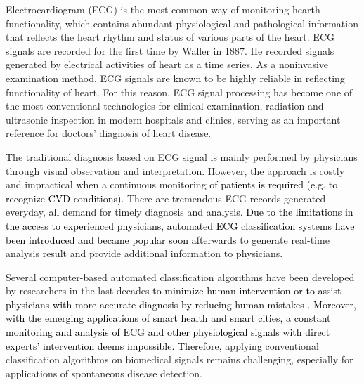 Electrocardiogram (ECG) is the most common way of monitoring hearth functionality, which %
contains abundant physiological and pathological information that reflects the heart rhythm and status of various parts of the heart. ECG signals are recorded for the first time by Waller in 1887\cite{besterman1979waller}. %
He recorded signals generated by electrical activities of heart as a time series. As a noninvasive examination method, ECG signals are known to be highly reliable in reflecting functionality of heart. For this reason, ECG signal processing has become one of the most conventional technologies for clinical examination, radiation and ultrasonic inspection in modern hospitals and clinics, serving as an important reference for doctors' diagnosis of heart disease\cite{kreger1987electrocardiogram}.


The traditional diagnosis based on ECG signal is mainly performed by physicians through visual observation and interpretation. %
However, the approach is costly and impractical when a continuous monitoring \textcolor{black}{of patients is required (e.g. to recognize CVD conditions). }%
There are tremendous ECG records generated everyday, all demand for timely diagnosis and analysis. %
\textcolor{black}{Due to the limitations in the access to experienced physicians, automated  ECG classification systems have been introduced and became popular soon afterwards} to generate real-time analysis result and provide additional information to physicians. 

Several computer-based automated classification algorithms have been developed by researchers in the last decades \textcolor{black}{to minimize human intervention or to assist physicians with more accurate diagnosis by reducing human mistakes \cite{lagerholm2000clustering, prasad2003classification, autofs, ceylan2009novel, osowski2004support, Hu_et_al,deChazal2006,llamedo2012automatic,bbnn,ince2009generic,Kiranyaz}.} \textcolor{black}{Moreover, with the emerging applications of smart health and smart cities, a constant monitoring and analysis of ECG and other physiological signals with direct experts' intervention deems impossible. Therefore,} applying conventional classification algorithms on biomedical signals remains challenging, especially for applications of spontaneous disease detection. 


